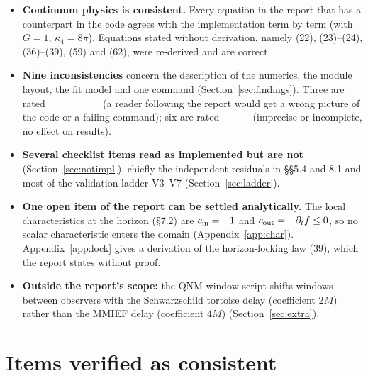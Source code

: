 \documentclass[11pt,a4paper]{article}
\newcommand{\sev}[2]{\colorbox{#1}{\textcolor{white}{\small\bfseries\sffamily #2}}}
\newcommand{\Med}{\sev{medsev}{MEDIUM}}
\newcommand{\Low}{\sev{lowsev}{LOW}}
\newcommand{\fd}{\partial_t f}
\begin{document}
\begin{itemize}
\item \textbf{Continuum physics is consistent.} Every equation in the report that has a
  counterpart in the code agrees with the implementation term by term (with $G=1$,
  $\kappa_4=8\pi$). Equations stated without derivation, namely (22), (23)--(24),
  (36)--(39), (59) and (62), were re-derived and are correct.
\item \textbf{Nine inconsistencies} concern the description of the numerics, the module layout,
  the fit model and one command (Section~\ref{sec:findings}). Three are rated
  \Med{} (a reader following the report would get a wrong picture of the code or a
  failing command); six are rated \Low{} (imprecise or incomplete, no effect on results).
\item \textbf{Several checklist items read as implemented but are not} (Section~\ref{sec:notimpl}),
  chiefly the independent residuals in \S\S5.4 and 8.1 and most of the validation ladder V3--V7
  (Section~\ref{sec:ladder}).
\item \textbf{One open item of the report can be settled analytically.} The local
  characteristics at the horizon (\S7.2) are $c_{\rm in}=-1$ and $c_{\rm out}=-\fd\le 0$, so no
  scalar characteristic enters the domain (Appendix~\ref{app:char}). Appendix~\ref{app:lock}
  gives a derivation of the horizon-locking law (39), which the report states without proof.
\item \textbf{Outside the report's scope:} the QNM window script shifts windows between observers
  with the Schwarzschild tortoise delay (coefficient $2M$) rather than the MMIEF delay
  (coefficient $4M$) (Section~\ref{sec:extra}).
\end{itemize}

\section{Items verified as consistent}
\end{document}
